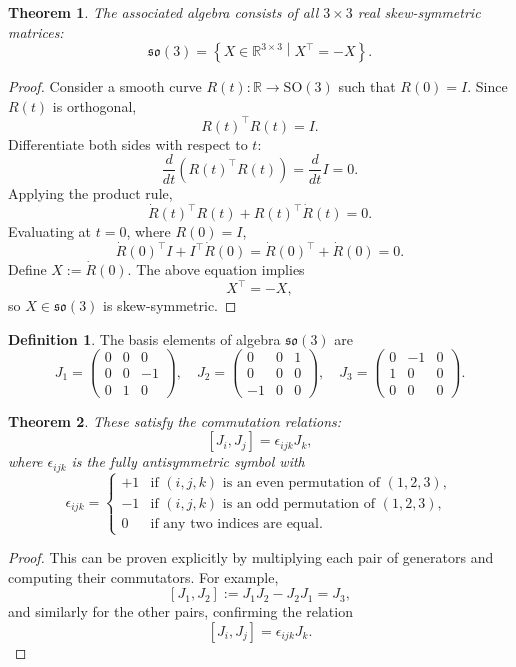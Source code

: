 \documentclass{amsart}
\newtheorem{theorem}{Theorem}[section]
\theoremstyle{definition}
\newtheorem{definition}{Definition}[theorem]
\theoremstyle{remark}
\begin{document}
\begin{theorem}\label{thm:so3_algebra_skew_symmetric}
  The associated algebra consists of all $3 \times 3$ real skew-symmetric matrices:
  \[
  \mathfrak{so}(3) = \left\{ X \in \mathbb{R}^{3 \times 3} \middle|
  X^\top = -X \right\}.
  \]
\end{theorem}

\begin{proof}
  Consider a smooth curve $R(t): \mathbb{R} \to \mathrm{SO}(3)$ such that $R(0) = I$. Since $R(t)$ is orthogonal,
  \[
  R(t)^\top R(t) = I.
  \]
  Differentiate both sides with respect to $t$:
  \[
  \frac{d}{dt} \left( R(t)^\top R(t) \right) = \frac{d}{dt} I = 0.
  \]
  Applying the product rule,
  \[
  \dot{R}(t)^\top R(t) + R(t)^\top \dot{R}(t) = 0.
  \]
  Evaluating at $t=0$, where $R(0) = I$,
  \[
  \dot{R}(0)^\top I + I^\top \dot{R}(0) = \dot{R}(0)^\top + \dot{R}(0) = 0.
  \]
  Define $X := \dot{R}(0)$. The above equation implies
  \[
  X^\top = -X,
  \]
  so $X \in \mathfrak{so}(3)$ is skew-symmetric.
\end{proof}

\begin{definition}
  The basis elements of algebra $\mathfrak{so}(3)$ are
  \[
  J_1 = \begin{pmatrix} 0 & 0 & 0 \\ 0 & 0 & -1 \\ 0 & 1 & 0 \end{pmatrix}, \quad
  J_2 = \begin{pmatrix} 0 & 0 & 1 \\ 0 & 0 & 0 \\ -1 & 0 & 0 \end{pmatrix}, \quad
  J_3 = \begin{pmatrix} 0 & -1 & 0 \\ 1 & 0 & 0 \\ 0 & 0 & 0 \end{pmatrix}.
  \]
\end{definition}

\begin{theorem}\label{thm:so3_commutation_relations}
  These satisfy the commutation relations:
  \[
  [J_i, J_j] = \epsilon_{ijk} J_k,
  \]
  where $\epsilon_{ijk}$ is the fully antisymmetric symbol with
  \[
  \epsilon_{ijk} =
  \begin{cases}
    +1 & \text{if } (i,j,k) \text{ is an even permutation of } (1,2,3), \\
    -1 & \text{if } (i,j,k) \text{ is an odd permutation of } (1,2,3), \\
    0 & \text{if any two indices are equal}.
  \end{cases}
  \]
\end{theorem}
\begin{proof}
  This can be proven explicitly by multiplying each pair of generators and computing their commutators. For example,
  \[
  [J_1, J_2] := J_1 J_2 - J_2 J_1 = J_3,
  \]
  and similarly for the other pairs, confirming the relation
  \[
  [J_i, J_j] = \epsilon_{ijk} J_k.
  \]
\end{proof}
\end{document}
